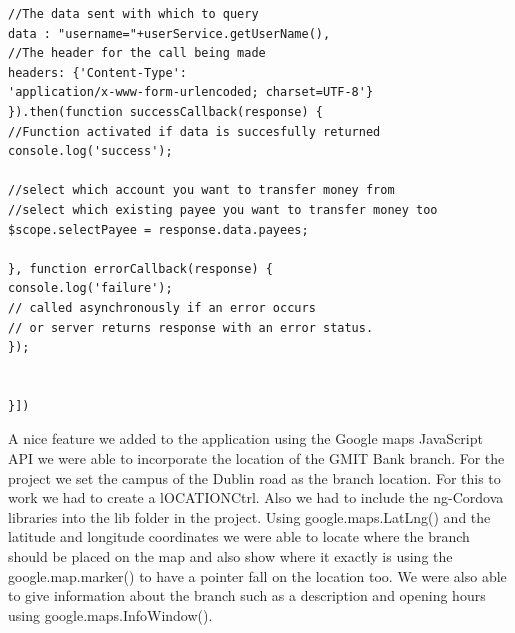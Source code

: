 \begin{verbatim}
//The data sent with which to query
data : "username="+userService.getUserName(),
//The header for the call being made
headers: {'Content-Type':
'application/x-www-form-urlencoded; charset=UTF-8'}
}).then(function successCallback(response) {
//Function activated if data is succesfully returned
console.log('success');

//select which account you want to transfer money from
//select which existing payee you want to transfer money too
$scope.selectPayee = response.data.payees;

}, function errorCallback(response) {
console.log('failure');
// called asynchronously if an error occurs
// or server returns response with an error status.
});


}])
\end{verbatim}

A nice feature we added to the application using the Google maps JavaScript API we were able to incorporate the location of the GMIT Bank branch. For the project we set the campus of the Dublin road as the branch location. For this to work we had to create a lOCATIONCtrl. Also we had to include the ng-Cordova libraries into the lib folder in the project. Using google.maps.LatLng() and the latitude and longitude coordinates we were able to locate where the branch should be placed on the map and also show where it exactly is using the google.map.marker() to have a pointer fall on the location too. We were also able to give information about the branch such as a description and opening hours using google.maps.InfoWindow().\cite{map}
